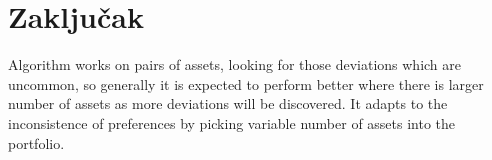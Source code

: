 \documentclass[lmodern, utf8, diplomski, numeric]{fer}
\begin{document}
  
  

  \chapter{Zaključak}
  Algorithm works on pairs of assets, looking for those deviations which are uncommon, so generally it is expected to perform better where there is larger number of assets as more deviations will be discovered.
  It adapts to the inconsistence of preferences by picking variable number of assets into the portfolio.
  
\end{document}
